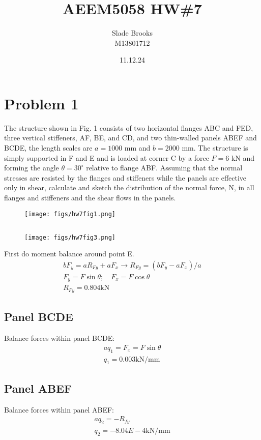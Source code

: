 \documentclass[12 pt]{article}
\title{AEEM5058 HW\#7}
\date{11.12.24}
\author{Slade Brooks \\ M13801712}
\begin{document}
\maketitle

\section*{Problem 1}
The structure shown in Fig. 1 consists of two horizontal flanges ABC and FED, three vertical
stiffeners, AF, BE, and CD, and two thin-walled panels ABEF and BCDE, the length scales are $a
=1000$ mm and $b =2000$ mm. The structure is simply supported in F and E and is loaded at corner
C by a force $F =6$ kN and forming the angle $\theta = 30^{\circ}$ relative to flange ABF. Assuming that the
normal stresses are resisted by the flanges and stiffeners while the panels are effective only in
shear, calculate and sketch the distribution of the normal force, N, in all flanges and stiffeners and
the shear flows in the panels.
\begin{figure}[H]
    \centering
    \texttt{[image: figs/hw7fig1.png]}
\end{figure}

\pagebreak
\subsection*{}
\begin{figure}[H]
    \centering
    \texttt{[image: figs/hw7fig3.png]}
\end{figure}
First do moment balance around point E.
\begin{align*}
    bF_y=aR_{Fy}+aF_x \rightarrow R_{Fy}=(bF_y-aF_x)/a \\
    F_y=F\sin{\theta}; \quad F_x=F\cos{\theta} \\
    R_{Fy}=0.804\textrm{kN}
\end{align*}

\subsection*{Panel BCDE}
Balance forces within panel BCDE:
\begin{align*}
    aq_1=F_x=F\sin{\theta} \\
    q_1=0.003 \textrm{kN/mm}
\end{align*}

\subsection*{Panel ABEF}
Balance forces within panel ABEF:
\begin{align*}
    aq_2=-R_{fy} \\
    q_2=-8.04E-4 \textrm{kN/mm}
\end{align*}
\end{document}
